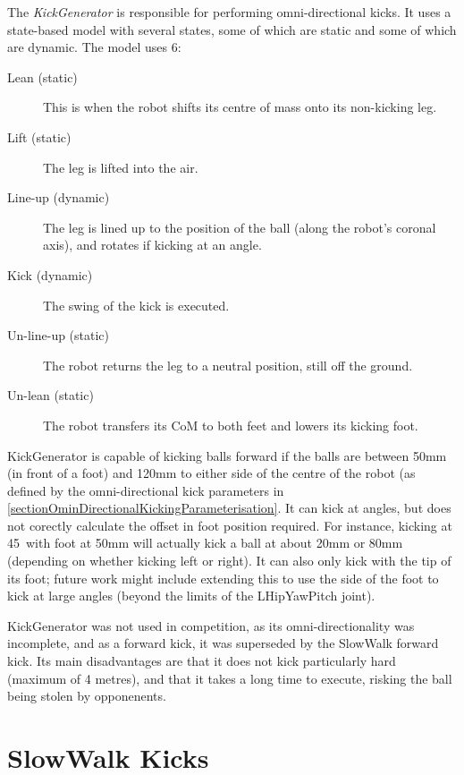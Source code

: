 \documentclass[pdftex,11pt,a4paper]{report}
\begin{document}
The \emph{KickGenerator} is responsible for performing omni-directional
kicks. It uses a state-based model with several states, some of which are
static and some of which are dynamic. The model uses 6:
\begin{description}
    \item[Lean (static)] This is when the robot shifts its centre of mass
        onto its non-kicking leg.
    \item[Lift (static)] The leg is lifted into the air.
    \item[Line-up (dynamic)] The leg is lined up to the position of the
        ball (along the robot's coronal axis), and rotates if kicking at an
        angle.
    \item[Kick (dynamic)] The swing of the kick is executed.
    \item[Un-line-up (static)] The robot returns the leg to a neutral position,
        still off the ground.
    \item[Un-lean (static)] The robot transfers its CoM to both feet and
        lowers its kicking foot.
\end{description}

KickGenerator is capable of kicking balls forward if the balls are between
50mm (in front of a foot) and 120mm to either side of the centre of the
robot (as defined by the omni-directional kick parameters in
\autoref{sectionOminDirectionalKickingParameterisation}. It can kick at
angles, but does not corectly calculate the offset in foot position
required. For instance, kicking at 45\textdegree~with foot at 50mm will
actually kick a ball at about 20mm or 80mm (depending on whether kicking
left or right). It can also only kick with the tip of its foot; future work
might include extending this to use the side of the foot to kick at large
angles (beyond the limits of the LHipYawPitch joint).

KickGenerator was not used in competition, as its omni-directionality was
incomplete, and as a forward kick, it was superseded by the SlowWalk
forward kick. Its main disadvantages are that it does not kick particularly
hard (maximum of 4 metres), and that it takes a long time to execute,
risking the ball being stolen by opponenents.
\section{SlowWalk Kicks} \label{sectionSlowWalkKicks}
\end{document}

